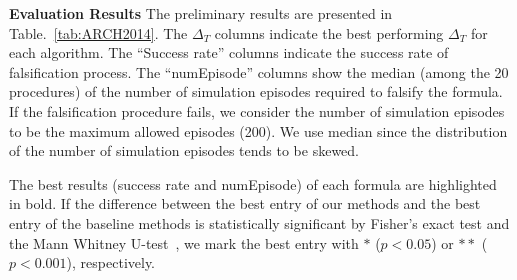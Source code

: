 \vspace{4mm}
\noindent \textbf{Evaluation Results}
The preliminary results are presented in Table.~\ref{tab:ARCH2014}.
%
%
The $\Delta_{T}$ columns indicate the best performing $\Delta_{T}$ for each algorithm.
The ``Success rate'' columns indicate the success rate of falsification process.
The ``numEpisode'' columns show the median (among the 20 procedures) of the number of simulation episodes required to falsify the formula.
If the falsification procedure fails, we consider the number of simulation episodes to be the maximum allowed episodes (200).
We use median since the distribution of the number of simulation episodes tends to be skewed.

The best results (success rate and numEpisode) of each formula are highlighted in bold.
If the difference between the best entry of our methods and the best entry of the baseline methods is statistically significant by Fisher's exact test and the Mann Whitney U-test~\cite{corder2014nonparametric}, we mark the best entry with $*$ ($p < 0.05$) or $**$ ($p < 0.001$), respectively.

